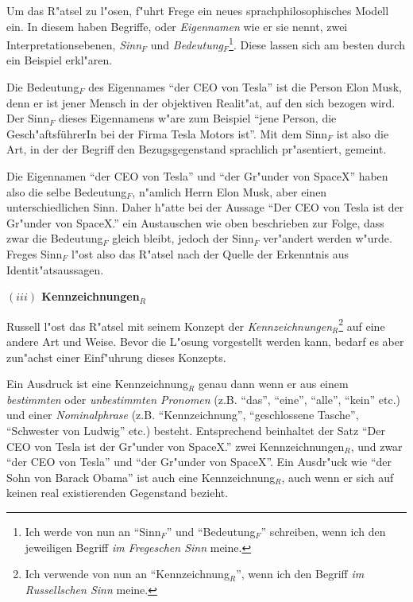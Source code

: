 \documentclass[a4paper, emulatestandardclasses, 12pt]{scrartcl}
\begin{document}
\begin{onehalfspace}
Um das R"atsel zu l"osen, f"uhrt Frege ein neues sprachphilosophisches Modell ein. In diesem haben Begriffe, oder \emph{Eigennamen} wie er sie nennt, zwei Interpretationsebenen, \emph{Sinn$_{F}$} und \emph{Bedeutung$_{F}$}\footnote{Ich werde von nun an "`Sinn$_{F}$"' und "`Bedeutung$_{F}$"' schreiben, wenn ich den jeweiligen Begriff \emph{im Fregeschen Sinn} meine.}. Diese lassen sich am besten durch ein Beispiel erkl"aren.

Die Bedeutung$_{F}$ des Eigennames "`der CEO von Tesla"' ist die Person Elon Musk, denn er ist jener Mensch in der objektiven Realit"at, auf den sich bezogen wird. Der Sinn$_{F}$ dieses Eigennamens w"are zum Beispiel  "`jene Person, die Gesch"aftsführerIn bei der Firma Tesla Motors ist"'. Mit dem Sinn$_{F}$ ist also die Art, in der der Begriff den Bezugsgegenstand sprachlich pr"asentiert, gemeint.

Die Eigennamen "`der CEO von Tesla"' und "`der Gr"under von SpaceX"' haben also die selbe Bedeutung$_{F}$, n"amlich Herrn Elon Musk, aber einen unterschiedlichen Sinn. Daher h"atte bei der Aussage "`Der CEO von Tesla ist der Gr"under von SpaceX."' ein Austauschen wie oben beschrieben zur Folge, dass zwar die Bedeutung$_{F}$ gleich bleibt, jedoch der Sinn$_{F}$ ver"andert werden w"urde. Freges Sinn$_{F}$ l"ost also das R"atsel nach der Quelle der Erkenntnis aus Identit"atsaussagen. \vspace{3mm}

\noindent\textbf{$(iii)$ Kennzeichnungen$_{R}$}	

Russell l"ost das R"atsel mit seinem Konzept der \emph{Kennzeichnungen}$_{R}$\footnote{Ich verwende von nun an "`Kennzeichnung$_{R}$"', wenn ich den Begriff \emph{im Russellschen Sinn} meine.} auf eine andere Art und Weise. Bevor die L"osung vorgestellt werden kann, bedarf es aber zun"achst einer Einf"uhrung dieses Konzepts. 

Ein Ausdruck ist eine Kennzeichnung$_{R}$ genau dann wenn er aus einem \emph{bestimmten} oder \emph{unbestimmten Pronomen} (z.B. "`das"', "`eine"', "`alle"', "`kein"' etc.) und einer \emph{Nominalphrase} (z.B. "`Kennzeichnung"', "`geschlossene Tasche"', "`Schwester von Ludwig"' etc.) besteht. Entsprechend beinhaltet der Satz "`Der CEO von Tesla ist der Gr"under von SpaceX."' zwei Kennzeichnungen$_{R}$, und zwar "`der CEO von Tesla"' und "`der Gr"under von SpaceX"'. Ein Ausdr"uck wie "`der Sohn von Barack Obama"' ist auch eine Kennzeichnung$_{R}$, auch wenn er sich auf keinen real existierenden Gegenstand bezieht. 


\end{onehalfspace}
\end{document}
